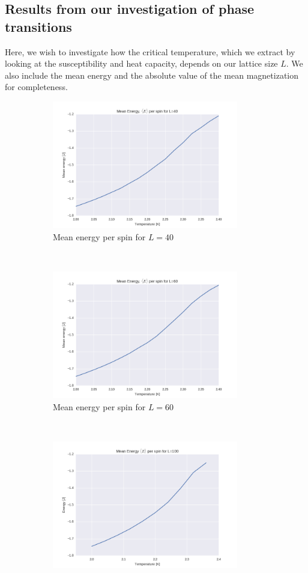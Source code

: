 \documentclass[a4paper, 10pt]{article}
\begin{document}
\subsection{Results from our investigation of phase transitions}
Here, we wish to investigate how the critical temperature, which we extract by looking at the susceptibility and heat capacity, depends on our lattice size $L$. We also include the mean energy and the absolute value of the mean magnetization for completeness. 
\begin{figure}[!ht]
    \centering
    \begin{subfigure}[H!]{0.5\textwidth}
        \centering
        \includegraphics[height=2.2in]{meanEnergyl40Ne5New.png}
        \caption{Mean energy per spin for $L=40$}
    \end{subfigure}%
    ~ 
    \begin{subfigure}[H!]{0.5\textwidth}
        \centering
        \includegraphics[height=2.2in]{meanEnergyl60Ne5New.png}
        \caption{Mean energy per spin for $L=60$}
    \end{subfigure}
        ~
     \begin{subfigure}[H!]{0.5\textwidth}
        \centering
        \includegraphics[height=2.2in]{meanEnergyl100Ne5New.png}

\end{subfigure}
\end{figure}
\end{document}
